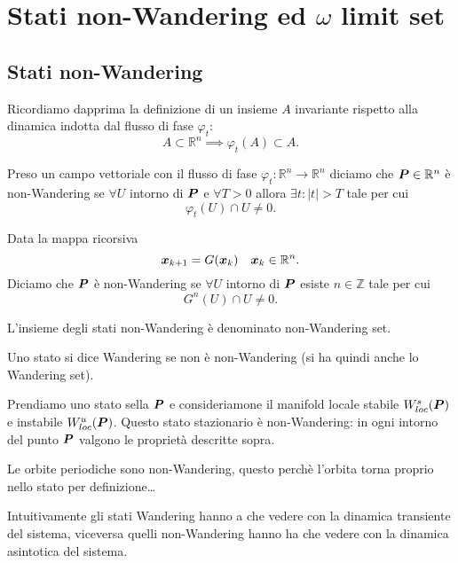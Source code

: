 \section{Stati non-Wandering ed $\omega$ limit set}%
\subsection{Stati non-Wandering}%
Ricordiamo dapprima la definizione di un insieme $A$ invariante rispetto alla dinamica indotta dal flusso di fase $\varphi_t$:
\[
    A \subset \mathbb{R}^n \implies  \varphi_t(A) \subset A
.\] 
\begin{defn}
Preso un campo vettoriale con il flusso di fase $\varphi_t:\mathbb{R}^n\to \mathbb{R}^n$ diciamo che $\boldsymbol{P} \in \mathbb{R}^n$ è non-Wandering se $\forall U$ intorno di $\boldsymbol{P}$ e $\forall T > 0$ allora $\exists t: \left|t\right|>T$ tale per cui
\[
    \varphi_t(U) \cap U \neq 0 
.\] 
\end{defn}
\noindent
\begin{defn}
    Data la mappa ricorsiva
    \[
	\boldsymbol{x}_{k+1} = G(\boldsymbol{x}_k) \quad  \boldsymbol{x}_k \in \mathbb{R}^n
    .\] 
    Diciamo che $\boldsymbol{P}$ è non-Wandering se $\forall U$ intorno di $\boldsymbol{P}$ esiste $n\in \mathbb{Z}$ tale per cui
    \[
	G^n(U)  \cap U \neq 0
    .\] 
\end{defn}
\noindent
\begin{defn}
    L'insieme degli stati non-Wandering è denominato non-Wandering set.
\end{defn}
\noindent
\begin{defn}
    Uno stato si dice Wandering se non è non-Wandering (si ha quindi anche lo Wandering set).
\end{defn}
\noindent
\begin{exmp}
    Prendiamo uno stato sella $\boldsymbol{P}$ e consideriamone il manifold locale stabile $W_{loc}^s(\boldsymbol{P})$ e instabile $W_{loc}^u(\boldsymbol{P})$. Questo stato stazionario è non-Wandering: in ogni intorno del punto $\boldsymbol{P}$ valgono le proprietà descritte sopra.
\end{exmp}
\noindent
\begin{exmp}
    Le orbite periodiche sono non-Wandering, questo perchè l'orbita torna proprio nello stato per definizione\ldots
\end{exmp}
\noindent
Intuitivamente gli stati Wandering hanno a che vedere con la dinamica transiente del sistema, viceversa quelli non-Wandering hanno ha che vedere con la dinamica asintotica del sistema.
